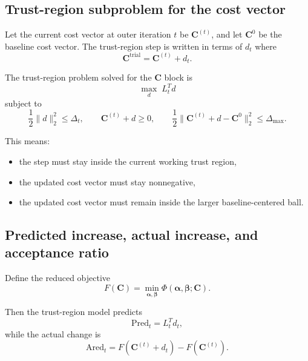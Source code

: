 \documentclass[11pt]{article}
\newcommand{\betavec}{\boldsymbol{\beta}}
\newcommand{\alphavec}{\boldsymbol{\alpha}}
\newcommand{\costvec}{\mathbf{C}}
\begin{document}
\subsection{Trust-region subproblem for the cost vector}

Let the current cost vector at outer iteration $t$ be $\costvec^{(t)}$, and let
$\costvec^0$ be the baseline cost vector. The trust-region step is written in
terms of $d_t$ where
\begin{equation}
\label{eq:trial-cost}
\costvec^{\mathrm{trial}} = \costvec^{(t)} + d_t.
\end{equation}

The trust-region problem solved for the $\costvec$ block is
\begin{equation}
\label{eq:trust-region-subproblem}
\max_{d}
\;
L_t^T d
\end{equation}
subject to
\begin{equation}
\label{eq:trust-region-constraints}
\frac{1}{2}\|d\|_2^2 \le \Delta_t,
\qquad
\costvec^{(t)} + d \ge 0,
\qquad
\frac{1}{2}\|\costvec^{(t)} + d - \costvec^0\|_2^2 \le \Delta_{\max}.
\end{equation}

This means:
\begin{itemize}
  \item the step must stay inside the current working trust region,
  \item the updated cost vector must stay nonnegative,
  \item the updated cost vector must remain inside the larger baseline-centered
  ball.
\end{itemize}

\subsection{Predicted increase, actual increase, and acceptance ratio}

Define the reduced objective
\begin{equation}
\label{eq:reduced-objective}
F(\costvec)
=
\min_{\alphavec, \betavec}
\Phi(\alphavec, \betavec; \costvec).
\end{equation}

Then the trust-region model predicts
\begin{equation}
\label{eq:predicted-increase}
\mathrm{Pred}_t = L_t^T d_t,
\end{equation}
while the actual change is
\begin{equation}
\label{eq:actual-increase}
\mathrm{Ared}_t
=
F(\costvec^{(t)} + d_t) - F(\costvec^{(t)}).
\end{equation}
\end{document}
